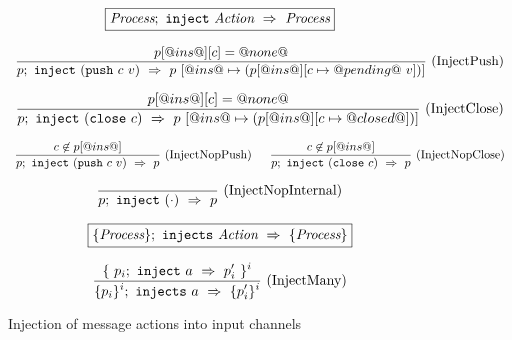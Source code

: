 
\begin{figure}

$$
\boxed{\textit{Process};~\texttt{inject}~\textit{Action}~\Rightarrow~\textit{Process}}
$$

$$
\enskip \frac {\displaystyle 
  p[@ins@][c] = @none@
} {\displaystyle 
  p;~\texttt{inject}~(\texttt{push}~c~v)~\Rightarrow~p~[@ins@ \mapsto (p[@ins@][c \mapsto @pending@~v]) ] 
} \  \mbox{(InjectPush)} \enskip
$$

$$
\enskip \frac {\displaystyle 
  p[@ins@][c] = @none@
} {\displaystyle 
  p;~\texttt{inject}~(\texttt{close}~c)~\Rightarrow~p~[@ins@ \mapsto (p[@ins@][c \mapsto @closed@]) ] 
} \  \mbox{(InjectClose)} \enskip
$$

$$
\ruleIN{
  c \not\in p[@ins@]
}{
  \ProcInject{p}{(\Push~c~v)}{p}
}{InjectNopPush}
%
\enskip
%
\ruleIN{
  c \not\in p[@ins@]
}{
  \ProcInject{p}{(\Close~c)}{p}
}{InjectNopClose}
$$

$$
\enskip \frac {\displaystyle } {\displaystyle 
  p;~\texttt{inject}~(\cdot)~\Rightarrow~p
} \  \mbox{(InjectNopInternal)} \enskip
$$


$$
\boxed{\{ \textit{Process} \};~\texttt{injects}~\textit{Action}~\Rightarrow~\{ \textit{Process} \}}
$$

$$
\enskip \frac {\displaystyle 
  \{~ p_i;~\texttt{inject}~a~\Rightarrow~p'_i ~\}^i
} {\displaystyle 
  \{ p_i \}^i;~\texttt{injects}~a~\Rightarrow~\{ p'_i \}^i
} \  \mbox{(InjectMany)} \enskip
$$

\caption{Injection of message actions into input channels}
\label{fig:Process:Eval:Inject}
\end{figure}


